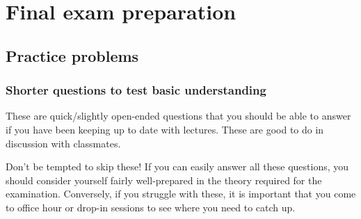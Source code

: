 \documentclass{amsart}
\begin{document}
\section{Final exam preparation}
\label{sec:org5f03410}
\subsection{Practice problems}
\label{sec:org957051b}
\subsubsection{Shorter questions to test basic understanding}
\label{sec:org4b44545}
These are quick/slightly open-ended questions that you should be able to answer if you have been keeping up to date with lectures. These are good to do in discussion with classmates.

Don't be tempted to skip these! If you can easily answer all these questions, you should consider yourself fairly well-prepared in the theory required for the examination. Conversely, if you struggle with these, it is important that you come to office hour or drop-in sessions to see where you need to catch up.
\end{document}

